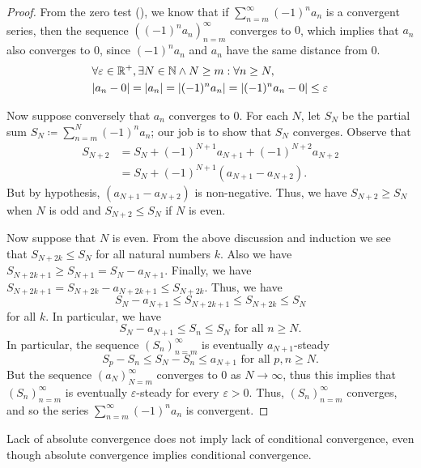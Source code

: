 \begin{proof}
  From the zero test (), we know that if \(\sum_{n = m}^\infty (-1)^n a_n\) is a convergent series, then the sequence \(((-1)^n a_n)_{n = m}^\infty\) converges to \(0\), which implies that \(a_n\) also converges to \(0\), since \((-1)^n a_n\) and \(a_n\) have the same distance from \(0\).
  \begin{align*}
     & \forall \varepsilon \in \R^+, \exists N \in \N \land N \geq m : \forall n \geq N,    \\
     & \abs{a_n - 0} = \abs{a_n} = \abs{(-1)^n a_n} = \abs{(-1)^n a_n - 0} \leq \varepsilon
  \end{align*}

  Now suppose conversely that \(a_n\) converges to \(0\).
  For each \(N\), let \(S_N\) be the partial sum \(S_N \coloneqq \sum_{n = m}^N (-1)^n a_n\);
  our job is to show that \(S_N\) converges.
  Observe that
  \begin{align*}
    S_{N + 2} & = S_N + (-1)^{N + 1} a_{N + 1} + (-1)^{N + 2} a_{N + 2} \\
              & = S_N + (-1)^{N + 1} (a_{N + 1} - a_{N + 2}).
  \end{align*}
  But by hypothesis, \((a_{N + 1} - a_{N + 2})\) is non-negative.
  Thus, we have \(S_{N + 2} \geq S_N\) when \(N\) is odd and \(S_{N + 2} \leq S_N\) if \(N\) is even.

  Now suppose that \(N\) is even.
  From the above discussion and induction we see that \(S_{N + 2k} \leq S_N\) for all natural numbers \(k\).
  Also we have \(S_{N + 2k + 1} \geq S_{N + 1} = S_N - a_{N + 1}\).
  Finally, we have \(S_{N + 2k + 1} = S_{N + 2k} - a_{N + 2k + 1} \leq S_{N + 2k}\).
  Thus, we have
  \[
    S_N - a_{N + 1} \leq S_{N + 2k + 1} \leq S_{N + 2k} \leq S_N
  \]
  for all \(k\).
  In particular, we have
  \[
    S_N - a_{N + 1} \leq S_n \leq S_N \text{ for all } n \geq N.
  \]
  In particular, the sequence \((S_n)_{n = m}^\infty\) is eventually \(a_{N + 1}\)-steady
  \[
    S_p - S_n \leq S_N - S_n \leq a_{N + 1} \text{ for all } p, n \geq N.
  \]
  But the sequence \((a_N)_{N = m}^\infty\) converges to \(0\) as \(N \to \infty\), thus this implies that \((S_n)_{n = m}^\infty\) is eventually \(\varepsilon\)-steady for every \(\varepsilon > 0\).
  Thus, \((S_n)_{n = m}^\infty\) converges, and so the series \(\sum_{n = m}^\infty (-1)^n a_n\) is convergent.
\end{proof}

\begin{note}
  Lack of absolute convergence does not imply lack of conditional convergence, even though absolute convergence implies conditional convergence.
\end{note}

